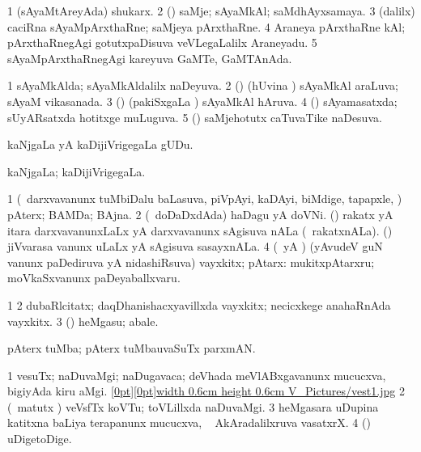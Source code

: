 {{{{\bentry
{} 
\gl{\nA}
\expl{}
\bmng
\bnum
\num{1} (sAyaMtAreyAda) shukarx. 
\num{2} (\kAparx) saMje; sAyaMkAl; saMdhAyxsamaya. 
\num{3} (\bava dalilx) caciRna sAyaMpArxthaRne; saMjeya pArxthaRne. 
\num{4} Araneya pArxthaRne kAl; pArxthaRnegAgi gotutxpaDisuva veVLegaLalilx Araneyadu. 
\num{5} sAyaMpArxthaRnegAgi kareyuva GaMTe, GaMTAnAda. 
\enum
\emng
\eentry

\bentry
{} 
\gl{\gu}
\expl{}
\bmng
\bnum
\num{1} sAyaMkAlda; sAyaMkAldalilx naDeyuva. 
\num{2} (\savi) (hUvina \vi) sAyaMkAl araLuva; sAyaM vikasanada. 
\num{3} (\jiVvi) (pakiSxgaLa \vi) sAyaMkAl hAruva. 
\num{4} (\Kavi) sAyamasatxda; sUyARsatxda hotitxge muLuguva. 
\num{5} (\pArxvi) saMjehotutx caTuvaTike naDesuva. 
\enum
\emng
\eentry

\bentry
{} 
\gl{\nA}
\bmng
 kaNjgaLa yA kaDijiVrigegaLa gUDu. 
\emng
\eentry

\bentry
{} 
\gl{\gu}
\expl{}
\bmng
 kaNjgaLa; kaDijiVrigegaLa. 
\emng
\eentry

\bentry
{} 
\gl{\nA}
\bmng
\bnum
\num{1} (\kanmu\ darxvavanunx tuMbiDalu baLasuva, piVpAyi, kaDAyi, biMdige, tapapxle, \mo) pAterx; BAMDa; BAjna. 
\num{2} (\kanmu\ doDaDxdAda) haDagu yA doVNi. 
\banum
{} (\aMrashA) rakatx yA itara darxvavanunxLaLx yA darxvavanunx sAgisuva nALa (\kanmu\ rakatxnALa). 
 (\savi) jiVvarasa \mo vanunx uLaLx yA sAgisuva sasayxnALa. 
\eanum
\numie
\num{4} (\beY\ yA \hA) (yAvudeV guN \mo vanunx paDediruva yA nidashiRsuva) vayxkitx; pAtarx:  mukitxpAtarxru; moVkaSxvanunx paDeyaballxvaru. 
\enum
\emng

\noindent 
\gl{\pagu}
\expl{}
\bmng
\bnum
\num{1}  
\num{2}  dubaRlcitatx; daqDhanishacxyavillxda vayxkitx; necicxkege anahaRnAda vayxkitx. 
\num{3}  (\beY) heMgasu; abale. 
\enum
\emng
\eentry

\bentry 
{} 
\gl{\nA}
\expl{}
\bmng
 pAterx tuMba; pAterx tuMbauvaSuTx parxmAN. 
\emng
\eentry

\bentry
{} 
\gl{\nA}
\bmng
{} 
\bnum
\num{1} vesuTx; naDuvaMgi; naDugavaca; deVhada meVlABxgavanunx mucucxva, bigiyAda kiru aMgi. \quad \hyperlink{vest1figure}{\raisebox{-0.20cm}[0pt][0pt]{\pdfimage width 0.6cm height 0.6cm {V_Pictures/vest1.jpg}}} 
\num{2} (\AseTxrXV\ matutx \ame) veVsfTx koVTu; toVLillxda naDuvaMgi. 
\hypertarget{vest(1)3}{} 
\num{3} heMgasara uDupina katitxna baLiya terapanunx mucucxva, \sA\  AkAradalilxruva vasatxrX. 
\num{4} (\pArxparx) uDigetoDige. 
\enum
\emng
\eentry

}}}}
